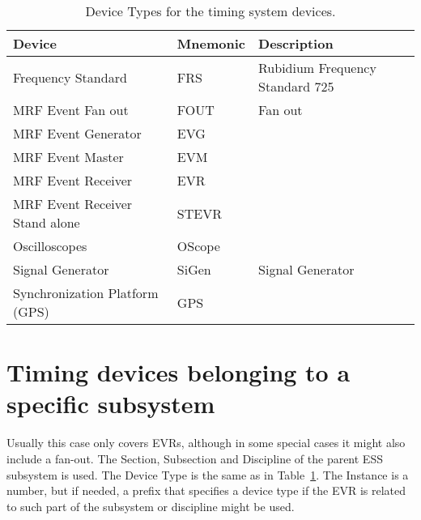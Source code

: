 \documentclass[11pt
  , a4paper
  , article
  , oneside
  , showtrims
]{memoir}
\begin{document}
\begin{table}[!htb]
  \centering
  \begin{tabular}{l l l}
    \toprule
    Device                          &  Mnemonic  &  Description                      \\\midrule
    Frequency Standard	            &  FRS   	   &  Rubidium Frequency Standard 725  \\\midrule
    MRF Event Fan out	              &  FOUT	     &  Fan out                          \\\midrule
    MRF Event Generator	            &  EVG       &                                   \\\midrule
    MRF Event Master	              &  EVM       &                                   \\\midrule
    MRF Event Receiver	            &  EVR       &                                   \\\midrule
    MRF Event Receiver Stand alone  &  STEVR     &                                   \\\midrule
    Oscilloscopes	                  &  OScope    &                                   \\\midrule
    Signal Generator	              &  SiGen	   &  Signal Generator                 \\\midrule
    Synchronization Platform (GPS)  &  GPS       &                                   \\\bottomrule
  \end{tabular}
  \caption[]{Device Types for the timing system devices.}
  \label{tab:devices}
\end{table}

\section{Timing devices belonging to a specific subsystem}
Usually this case only covers EVRs, although in some special cases it might also include a fan-out. The Section, Subsection and Discipline of the parent ESS subsystem is used. The Device Type is the same as in Table~\ref{tab:devices}. The Instance is a number, but if needed, a prefix that specifies a device type if the EVR is related to such part of the subsystem or discipline might be used.
\end{document}
